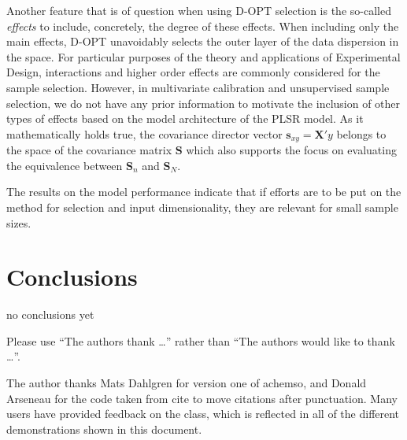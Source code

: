 \documentclass[journal=ancham,manuscript=article]{achemso}
\begin{document}
Another feature that is of question when using D-OPT selection is the so-called \emph{effects} to include, concretely, the degree of these effects. When including only the main effects, D-OPT unavoidably selects the outer layer of the data dispersion in the space. For particular purposes of the theory and applications of Experimental Design, interactions and higher order effects are commonly considered for the sample selection. However, in multivariate calibration and unsupervised sample selection, we do not have any prior information to motivate the inclusion of other types of effects based on the model architecture of the PLSR model. As it mathematically holds true, the covariance director vector $\mathbf{s}_{xy} = \mathbf{X}'y$ belongs to the space of the covariance matrix $\mathbf{S}$ which also supports the focus on evaluating the equivalence between $\mathbf{S}_n$ and $\mathbf{S}_N$. 


The results on the model performance indicate that if efforts are to be put on the method for selection and input dimensionality, they are relevant for small sample sizes. 




\section*{Conclusions}\label{conclusions}
no conclusions yet


\begin{acknowledgement}

Please use ``The authors thank \ldots'' rather than ``The
authors would like to thank \ldots''.

The author thanks Mats Dahlgren for version one of \textsf{achemso},
and Donald Arseneau for the code taken from \textsf{cite} to move
citations after punctuation. Many users have provided feedback on the
class, which is reflected in all of the different demonstrations
shown in this document.

\end{acknowledgement}





\end{document}
